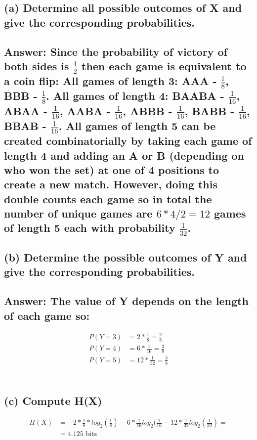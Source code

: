\documentclass[11px]{article}
\begin{document}
\subsection*{\normalfont (a) Determine all possible outcomes of X and give the corresponding probabilities.}
\subsection*{ Answer: Since the probability of victory of both sides is \(\frac{1}{2}\) then each game is equivalent to a coin flip: All games of length 3: AAA - \(\frac{1}{8}\), BBB - \(\frac{1}{8}\). All games of length 4: BAABA - \(\frac{1}{16}\), ABAA - \(\frac{1}{16}\), AABA - \(\frac{1}{16}\), ABBB - \(\frac{1}{16}\), BABB - \(\frac{1}{16}\), BBAB - \(\frac{1}{16}\). All games of length 5 can be created combinatorially by taking each game of length 4 and adding an A or B (depending on who won the set) at one of 4 positions to create a new match. However, doing this double counts each game so in total the number of unique games are \(6*4/2 = 12\) games of length 5 each with probability \(\frac{1}{32}\).}

\subsection*{\normalfont (b) Determine the possible outcomes of Y and give the corresponding probabilities.}

\subsection*{Answer: The value of Y depends on the length of each game so:}

\begin{equation}
\begin{split}
P(Y = 3) & = 2*\frac{1}{8} = \frac{2}{8}\\
P(Y = 4) & = 6*\frac{1}{16} = \frac{3}{8}\\
P(Y = 5) & = 12*\frac{1}{32} = \frac{3}{8}\\
\end{split}
\end{equation} \\

\subsection*{\normalfont (c) Compute H(X)}

\begin{equation}
\begin{split}
H(X) & = -2*\frac{1}{8}*log_2(\frac{1}{8}) - 6*\frac{1}{16}log_2(\frac{1}{16} - 12*\frac{1}{32}log_2(\frac{1}{32}) = \\ & = 4.125 \text{ bits}
\end{split}
\end{equation}
\end{document}
